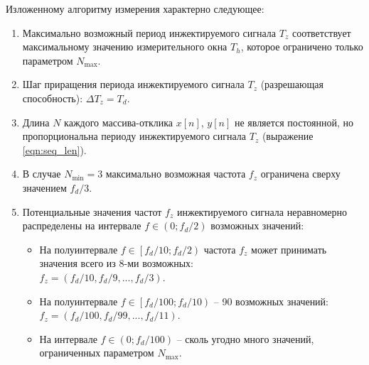 Изложенному алгоритму измерения характерно следующее:
\begin{enumerate}
    \item Максимально возможный период инжектируемого сигнала ${T_z}$ соответствует максимальному значению измерительного окна ${T_h}$, которое ограничено только параметром ${N_\text{max}}$.
    
    \item Шаг приращения периода инжектируемого сигнала ${T_z}$ (разрешающая способность): ${\Delta T_z = T_d}$.
    
    \item Длина $N$ каждого массива-отклика ${x\left[n\right]}$, ${y\left[n\right]}$ не является постоянной, но пропорциональна периоду инжектируемого сигнала ${T_z}$ (выражение \eqref{eqn:seq_len}).
    
    \item В случае ${N_\text{min}=3}$ максимально возможная частота ${f_z}$ ограничена сверху значением ${f_d / 3}$.
    
    \item Потенциальные значения частот ${f_z}$ инжектируемого сигнала неравномерно распределены на интервале ${f \in \left(0; {f_d / 2} \right)}$ возможных значений:
    \begin{itemize}
        \item На полуинтервале ${f \in \left[{f_d / 10}; {f_d / 2} \right)}$ частота ${f_z}$ может принимать значения всего из 8-ми возможных: \\
        ${f_z = \left({f_d / 10}, {f_d / 9}, ..., {f_d / 3} \right)}$.
        \item На полуинтервале ${f \in \left[{f_d / 100}; {f_d / 10} \right)}$ -- 90 возможных значений: \\
        ${f_z = \left({f_d / 100}, {f_d / 99}, ..., {f_d / 11} \right)}$.
        \item На интервале ${f \in \left(0; {f_d / 100} \right)}$ -- сколь угодно много значений, ограниченных параметром ${N_\text{max}}$.
    \end{itemize}
\end{enumerate}